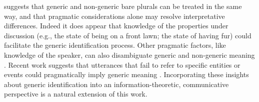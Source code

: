 \documentclass[12pt,letterpaper]{article}
\begin{document}
 suggests that generic and non-generic bare plurals can be treated in the same way, and that pragmatic considerations alone may resolve interpretative differences. 
Indeed it does appear that knowledge of the properties under discussion (e.g., the state of being on a front lawn; the state of having fur) could facilitate the generic identification process.
Other pragmatic factors, like knowledge of the speaker, can also disambiguate generic and non-generic meaning \cite{Cimpian2008}.
Recent work suggests that utterances that fail to refer to specific entities or events could pragmatically imply generic meaning \cite{Crone2016cogsci}.
Incorporating these insights about generic identification into an information-theoretic, communicative perspective is a natural extension of this work.



\end{document}
